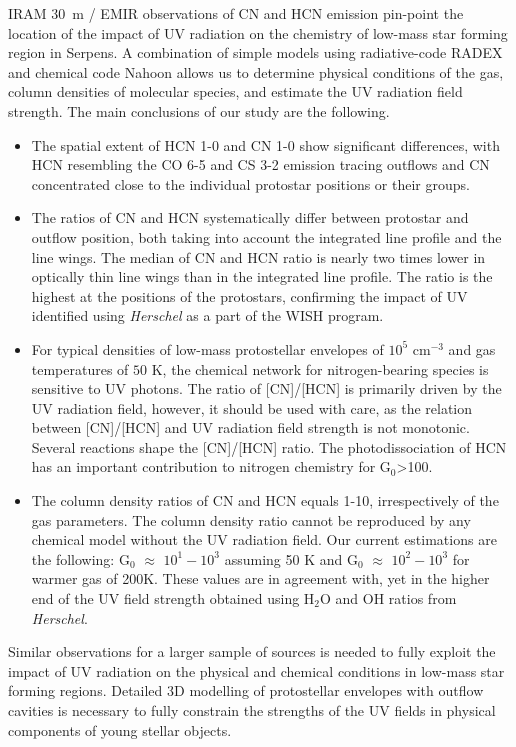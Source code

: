 \documentclass{aa}
\begin{document}
IRAM 30~m / EMIR observations of CN and HCN emission pin-point the location 
of the impact of UV radiation on the chemistry of low-mass star forming region in Serpens. 
A combination of simple models using radiative-code RADEX and chemical code Nahoon 
allows us to determine physical conditions of the gas, column densities of molecular species,
and estimate the UV radiation field strength. The main conclusions of our study are the 
following. 
\begin{itemize} 
\item The spatial extent of HCN 1-0 and CN 1-0 show significant differences, with 
HCN resembling the CO 6-5 and CS 3-2 emission tracing outflows and CN concentrated close to the individual protostar positions or their groups.
\item The ratios of CN and HCN systematically differ between protostar and outflow position,
both taking into account the integrated line profile and the line wings. The median of CN and HCN ratio is nearly two times lower in optically thin line wings than in the integrated line profile. The ratio 
is the highest at the positions of the protostars, confirming the impact of UV identified 
using \textit{Herschel} as a part of the WISH program. 
\item For typical densities of low-mass protostellar envelopes of $10^5$ cm$^{-3}$ and 
gas temperatures of $50$ K, the chemical network for nitrogen-bearing species is sensitive to UV photons. The ratio of [CN]/[HCN] is primarily driven by the UV radiation field, however, it should be used with care, as the relation between [CN]/[HCN] and UV radiation field strength is not monotonic. Several reactions shape the [CN]/[HCN] ratio. The photodissociation of HCN has an important contribution to nitrogen chemistry for G$_0$>100.
\item The column density ratios of CN and HCN equals 1-10, irrespectively of the gas parameters. The column density ratio cannot be reproduced by any chemical model without the UV radiation field. Our current estimations are the following: G$_0$ $\approx$ $10^{1}-10^{3}$ assuming 50 K and G$_0$ $\approx$ $10^{2}-10^{3}$ for warmer gas of 200K.
These values are in agreement with, yet in the higher end of the UV field strength obtained using 
H$_2$O and OH ratios from \textit{Herschel}.
\end{itemize}

Similar observations for a larger sample of sources is needed to fully exploit 
the impact of UV radiation on the physical and chemical conditions in low-mass star 
forming regions. Detailed 3D modelling of protostellar envelopes with outflow cavities 
is necessary to fully constrain the strengths of the UV fields in physical components 
of young stellar objects.
\end{document}
